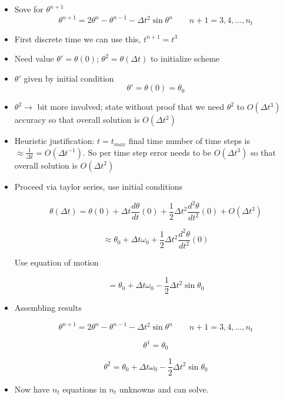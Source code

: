 \begin{itemize}
    \item Sove for $\theta^{n+1}$
    \begin{equation}
        \theta^{n+1} = 2\theta ^n - \theta^{n-1} - \Delta t^2 \sin \theta^n \qquad n+1= 3,4,...,n_t
    \end{equation} 

    \item First discrete time we can use this, $t^{n+1} = t^3$

    \item Need value $\theta' = \theta(0)$; $\theta^2 = \theta(\Delta t)$ to initialize scheme 

    \item $\theta ' $ given by initial condition
    \[ \theta ' = \theta (0) = \theta_0\]

    \item $\theta^2 \rightarrow$ bit more involved; state without proof that we need $\theta^2$ to $O(\Delta t^3)$ accuracy so that overall solution is $O(\Delta t^2)$

    \item Heuristic justification: $t=t_{max}$ final time number of time steps is $\approx \frac{1}{\Delta t} = O(\Delta t^{-1})$. So per time step error needs to be $O(\Delta t^3)$ so that overall solution is $O(\Delta t^2)$

    \item Proceed via taylor series, use initial conditions 

    \[ \theta(\Delta t) = \theta (0) + \Delta t \frac{d\theta}{dt}(0) + \frac{1}{2} \Delta t^2 \frac{d^2\theta}{dt^2} (0) + O(\Delta t^3)\]

    \[ \approx \theta_0 + \Delta t \omega_0 + \frac{1}{2} \Delta t^2 \frac{d^2\theta}{dt^2}(0)\]

    Use equation of motion

    \[ = \theta_0 + \Delta t \omega_0 - \frac{1}{2} \Delta t^2 \sin\theta_0\]

    \item Assembling results

    \[ \theta^{n+1} = 2 \theta^n - \theta^{n-1} - \Delta t^2 \sin\theta^n \qquad n+1=3,4,...,n_t\]

    \[ \theta^1 = \theta_0\]

    \[ \theta^2 = \theta_0 + \Delta t \omega_0 - \frac{1}{2} \Delta t^2 \sin\theta_0\]

    \item Now have $n_t$ equations in $n_t$ unknowns and can solve.
\end{itemize}



